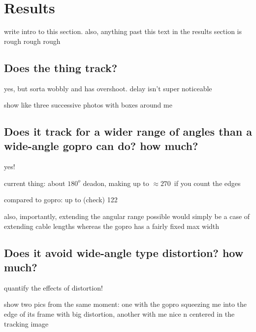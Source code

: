 \chapter{Results}

{\Large \color{red} write intro to this section. also, anything past this text in the results section is rough rough rough}

\section{Does the thing track?}
yes, but sorta wobbly and has overshoot. delay isn't super noticeable

show like three successive photos with boxes around me




\section{Does it track for a wider range of angles than a wide-angle gopro can do? how much?}
yes!

current thing: about $180^o$ deadon, making up to $\approx 270$\textdegree\ if you count the edges

compared to gopro: up to (check) 122\textdegree

also, importantly, extending the angular range possible would simply be a case of extending cable lengths whereas the gopro has a fairly fixed max width




\section{Does it avoid wide-angle type distortion? how much?}
quantify the effects of distortion!

show two pics from the same moment: one with the gopro squeezing me into the edge of its frame with big distortion, another with me nice n centered in the tracking image







